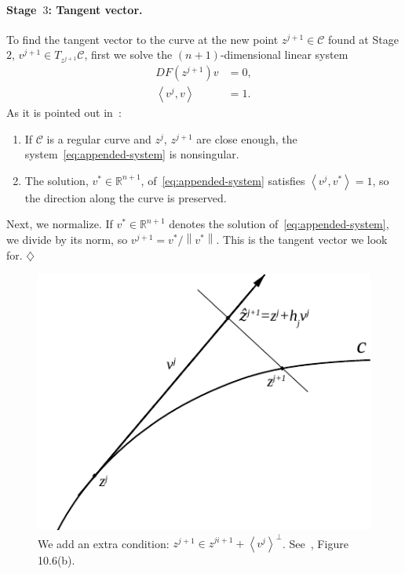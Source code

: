\documentclass[11pt,reqno,twoside]{article}
\newcommand{\R}{\ensuremath{\mathbb{R}}}
\theoremstyle{remark}
\begin{document}
\paragraph{Stage~$3$: Tangent vector.} To find the tangent vector to the
curve at the new point $z^{j+1}\in\mathcal{C}$ found at Stage
$2$, $v^{j+1}\in  T_{z^{j+1}}\mathcal{C}$, first we solve the
$(n+1)$-dimensional linear system
    \begin{equation}\label{eq:appended-system}
      \begin{split}
      DF\left(z^{j+1}\right)v &= 0,\\
      \left\langle v^{j}, v \right\rangle &= 1.
    \end{split}
  \end{equation}
  As it is pointed out in~\cite{Kuznetsov2004}:
  \begin{enumerate}[label = \emph{(\roman*)}]
    \item If $\mathcal{C}$ is a regular curve and $z^{j}$, $z^{j+1}$ are close
  enough, the system~\eqref{eq:appended-system} is nonsingular.
    \item The solution, $v^{\ast}\in\R^{n+1}$,
  of~\eqref{eq:appended-system} satisfies $\left\langle v^{j},
  v^{\ast}\right\rangle = 1$, so the direction along the curve is
  preserved.
\end{enumerate}
Next, we normalize. If $v^{\ast}\in\R^{n+1}$ denotes the solution
of~\eqref{eq:appended-system}, we divide by its norm, so $v^{j+1} =
v^{\ast}/\left\|v^{\ast}\right\|$. This is the tangent vector we look for.
\hfill $\diamondsuit$

\begin{figure}[!t]
  \centering
  \includegraphics[scale=1.0]{arcstep}
  \caption{We add an extra condition: $z^{j+1}\in
  \hat{z}^{ji+1} + \left\langle v^{j}\right\rangle^{\perp}$.
See~\cite{Kuznetsov2004}, Figure 10.6(b).\label{fig:pseudo-arc}}
\end{figure}
\end{document}
